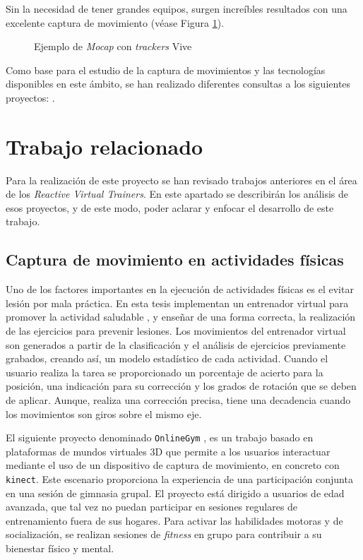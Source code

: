 Sin la necesidad de tener grandes equipos, surgen increíbles resultados con una excelente captura de movimiento (véase Figura \ref{fig:ViveMocap}).

\begin{figure}[h!]
    \centering
    \caption{Ejemplo de \textit{Mocap} con \textit{trackers} Vive}
    \label{fig:ViveMocap}  
\end{figure}


Como base para el estudio de la captura de movimientos y las tecnologías disponibles en este ámbito, se han realizado diferentes consultas a los siguientes proyectos: \cite{ Menendez2015} \cite{ Mejias2014} \cite{VIC}.

\section{Trabajo relacionado}

Para la realización de este proyecto se han revisado trabajos anteriores en el área de los \textit{Reactive Virtual Trainers}. En este apartado se describirán los análisis de esos proyectos, y de este modo, poder aclarar y enfocar el desarrollo de este trabajo.

\subsection{Captura de movimiento en actividades físicas}

Uno de los factores importantes en la ejecución de actividades físicas es el evitar lesión por mala práctica. En esta tesis \cite{Staab:Thesis:2014} implementan un entrenador virtual para promover la actividad saludable , y enseñar de una forma correcta, la realización de las ejercicios para prevenir lesiones. Los movimientos del entrenador virtual son generados a partir de la clasificación y el análisis de ejercicios previamente grabados, creando así, un modelo estadístico de cada actividad. Cuando el usuario realiza la tarea se proporcionado un porcentaje de acierto para la posición, una indicación para su corrección y los grados de rotación que se deben de aplicar. Aunque, realiza una corrección precisa, tiene una decadencia cuando los movimientos son giros sobre el mismo eje.

El siguiente proyecto denominado \texttt{OnlineGym} \cite{Paredes2014} , es un  trabajo basado en plataformas de mundos virtuales 3D que permite a los usuarios interactuar mediante el uso de un dispositivo de captura de movimiento, en concreto con \texttt{kinect}. Este escenario proporciona la experiencia de una participación conjunta en una sesión de gimnasia grupal. El proyecto está dirigido a usuarios de edad avanzada, que tal vez no puedan participar en sesiones regulares de entrenamiento fuera de sus hogares. Para activar las habilidades motoras y de socialización, se realizan sesiones de \textit{fitness} en grupo para contribuir a su bienestar físico y mental. 

